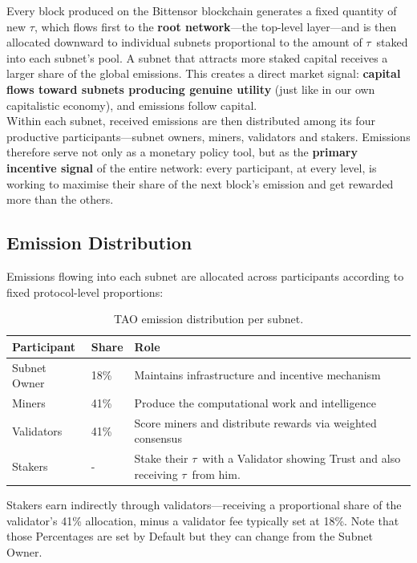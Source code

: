 \documentclass[12pt, a4paper, oneside]{report}
\newcommand{\TAO}{$\tau$}            %
\theoremstyle{definition}
\begin{document}
Every block produced on the Bittensor blockchain generates a fixed quantity of 
new \TAO, which flows first to the \textbf{root network}—the top-level  
layer—and is then allocated downward to individual subnets proportional to the 
amount of \TAO\ staked into each subnet's pool. A subnet that attracts more 
staked capital receives a larger share of the global emissions. This creates a 
direct market signal: \textbf{capital flows toward subnets producing genuine 
utility} (just like in our own capitalistic economy), and emissions follow capital.\\[0.4cm]

Within each subnet, received emissions are then distributed among its four 
productive participants—subnet owners, miners, validators and stakers. Emissions therefore serve not only as a 
monetary policy tool, but as the \textbf{primary incentive signal} of the 
entire network: every participant, at every level, is working to maximise 
their share of the next block's emission and get rewarded more than the others.


\subsection{Emission Distribution}

Emissions flowing into each subnet are allocated across participants according to 
fixed protocol-level proportions:

\begin{table}[H]
\centering
\renewcommand{\arraystretch}{1.6}
\begin{tabular}{p{3.5cm} p{2cm} p{7.5cm}}
\toprule
\textbf{Participant} & \textbf{Share} & \textbf{Role} \\
\midrule
Subnet Owner  & 18\% & Maintains infrastructure and incentive mechanism \\
Miners        & 41\% & Produce the computational work and intelligence \\
Validators    & 41\% & Score miners and distribute rewards via weighted consensus \\
Stakers       & -    & Stake their \TAO \ with a Validator showing Trust and also receiving \TAO\ from him.\\  
\bottomrule
\end{tabular}
\caption{TAO emission distribution per subnet.}
\label{tab:emissions}
\end{table}

\noindent Stakers earn indirectly through validators—receiving a proportional share 
of the validator's 41\% allocation, minus a validator fee typically set at 18\%. Note that those Percentages are set by Default but they can change from the Subnet Owner.
\end{document}
